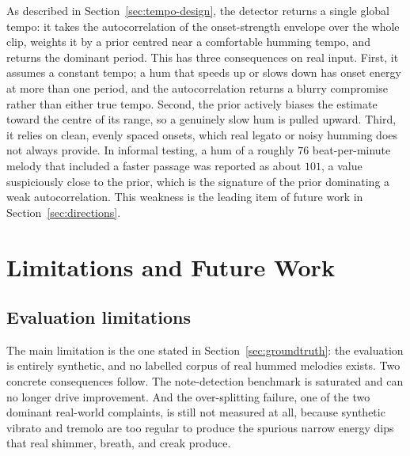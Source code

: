 \documentclass[12pt,a4paper]{article}
\begin{document}
As described in Section~\ref{sec:tempo-design}, the detector returns a single
global tempo: it takes the autocorrelation of the onset-strength envelope over
the whole clip, weights it by a prior centred near a comfortable humming tempo,
and returns the dominant period. This has three consequences on real input.
First, it assumes a constant tempo; a hum that speeds up or slows down has onset
energy at more than one period, and the autocorrelation returns a blurry
compromise rather than either true tempo. Second, the prior actively biases the
estimate toward the centre of its range, so a genuinely slow hum is pulled
upward. Third, it relies on clean, evenly spaced onsets, which real legato or
noisy humming does not always provide. In informal testing, a hum of a roughly
$76$ beat-per-minute melody that included a faster passage was reported as about
$101$, a value suspiciously close to the prior, which is the signature of the
prior dominating a weak autocorrelation. This weakness is the leading item of
future work in Section~\ref{sec:directions}.

\section{Limitations and Future Work}

\subsection{Evaluation limitations}
\label{sec:eval-limits}

The main limitation is the one stated in Section~\ref{sec:groundtruth}: the
evaluation is entirely synthetic, and no labelled corpus of real hummed
melodies exists. Two concrete consequences follow. The note-detection benchmark
is saturated and can no longer drive improvement. And the over-splitting
failure, one of the two dominant real-world complaints, is still not measured
at all, because synthetic vibrato and tremolo are too regular to produce the
spurious narrow energy dips that real shimmer, breath, and creak produce.
\end{document}

